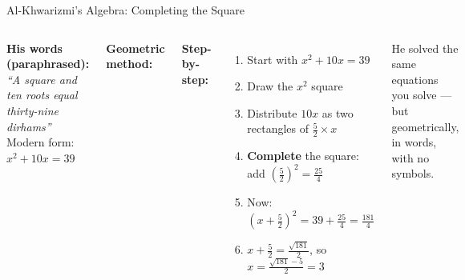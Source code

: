 \begin{frame}{Al-Khwarizmi's Algebra: Completing the Square}
  \begin{columns}[T]
    {\small\textbf{His words (paraphrased):}}\\[2pt]
    {\footnotesize\itshape ``A square and ten roots equal thirty-nine dirhams''}\\[4pt]
    {\small Modern form: $x^2 + 10x = 39$}

    \vspace{0.6em}
    {\small\textbf{Geometric method:}}


    {\small\textbf{Step-by-step:}}
    \begin{enumerate}\setlength\itemsep{2pt}
      \item[\textcolor{islamicGreen}{\textbf{1.}}] {\footnotesize Start with $x^2 + 10x = 39$}
      \item[\textcolor{islamicGreen}{\textbf{2.}}] {\footnotesize Draw the $x^2$ square}
      \item[\textcolor{islamicGreen}{\textbf{3.}}] {\footnotesize Distribute $10x$ as two rectangles of $\frac{5}{2} \times x$}
      \item[\textcolor{islamicGreen}{\textbf{4.}}] {\footnotesize \textcolor{accentOrange}{\textbf{Complete}} the square: add $\left(\frac{5}{2}\right)^2 = \frac{25}{4}$}
      \item[\textcolor{islamicGreen}{\textbf{5.}}] {\footnotesize Now: $\left(x+\frac{5}{2}\right)^2 = 39 + \frac{25}{4} = \frac{181}{4}$}
      \item[\textcolor{islamicGreen}{\textbf{6.}}] {\footnotesize $x + \frac{5}{2} = \frac{\sqrt{181}}{2}$, so $x = \frac{\sqrt{181}-5}{2} = 3$}
    \end{enumerate}

    \vspace{0.5em}
    \begin{insightbox}
      {\footnotesize He solved the same equations you solve --- but geometrically, in words, with no symbols.}
    \end{insightbox}
  \end{columns}

\end{frame}

